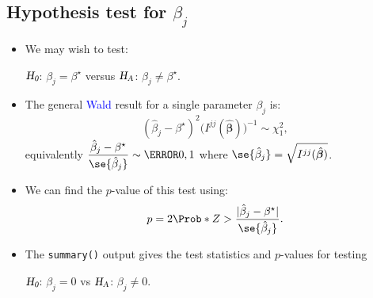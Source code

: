 \documentclass[oneside]{book}\usepackage[]{graphicx}\usepackage[svgnames]{xcolor}
\newcommand{\HN}{\textsl{H}_{\textsl{0}}}%
\newcommand{\HA}{\textsl{H}_{\textsl{A}}}%
\DeclarePairedDelimiter\abs{\lvert}{\rvert}
\providecommand{\Vector}[1]{\bm{#1}}%
\begin{document}
\subsection*{Hypothesis test for $ \beta_j $}
\begin{itemize}
      \item We may wish to test:
            \begin{center}
                  $ \HN $: $ \beta_j=\beta^\star $ versus $ \HA $: $ \beta_j\ne \beta^\star $.
            \end{center}
      \item The general \textcolor{Blue}{Wald} result for a single parameter $ \beta_j $ is:
            \[ (\hat{\beta}_j-\beta^\star)^2\bigl(I^{jj}(\hat{\Vector{\beta}})\bigr)^{-1} \sim \chi^2_1, \]
            equivalently
            $ \displaystyle \frac{\hat{\beta}_j-\beta^\star}{\se{\hat{\beta}_j}}\sim \N{0,1} $
            where $ \se{\hat{\beta}_j}=\sqrt{I^{jj}(\hat{\Vector{\beta}})} $.
      \item We can find the $ p $-value of this test using:
            \[ p=2\Prob*{Z>\frac{\abs{\hat{\beta}_j-\beta^\star}}{\se{\hat{\beta}_j}}}. \]
      \item The \texttt{summary()} output gives the test statistics and $p$-values for testing
            \begin{center}
                  $ \HN $: $ \beta_j=0 $ vs $ \HA $: $ \beta_j\ne 0 $.
            \end{center}
\end{itemize}
\end{document}
